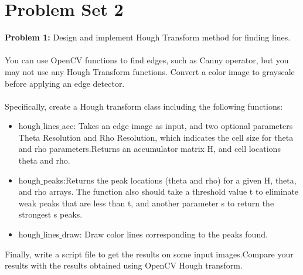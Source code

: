 \documentclass[a4paper, 12pt]{report}
\begin{document}
\section*{{\textbf{Problem Set 2}}}
\textbf{Problem 1:}
Design and implement Hough Transform method for finding lines. 
\\ \\
You can use OpenCV functions to find edges, such as Canny operator, but you may not use any Hough Transform functions. Convert a color image to grayscale before applying an edge detector.
\\ \\
Specifically, create a Hough transform class including the following functions:
\begin{itemize}
\item hough$\_$lines$\_$acc: Takes an edge image as input, and two optional parameters Theta Resolution and Rho Resolution, which indicates the cell size for theta and rho parameters.Returns an accumulator matrix H, and cell locations theta and rho. 
\item hough$\_$peaks:Returns the peak locations (theta and rho) for a given H, theta, and rho arrays. The function also should take a threshold value t to eliminate weak peaks that are less than t, and another parameter s to return the strongest s peaks.
\item hough$\_$lines$\_$draw: Draw color lines corresponding to the peaks found.
\end{itemize}
Finally, write a script file to get the results on some input images.Compare your results with the results obtained using OpenCV Hough transform. 
\\ \\
\end{document}
